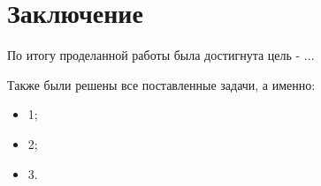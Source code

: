 \chapter*{Заключение}
По итогу проделанной работы была достигнута цель - ...

Также были решены все поставленные задачи, а именно:

\begin{itemize}
	\item 1;
	\item 2;
	\item 3.
\end{itemize}